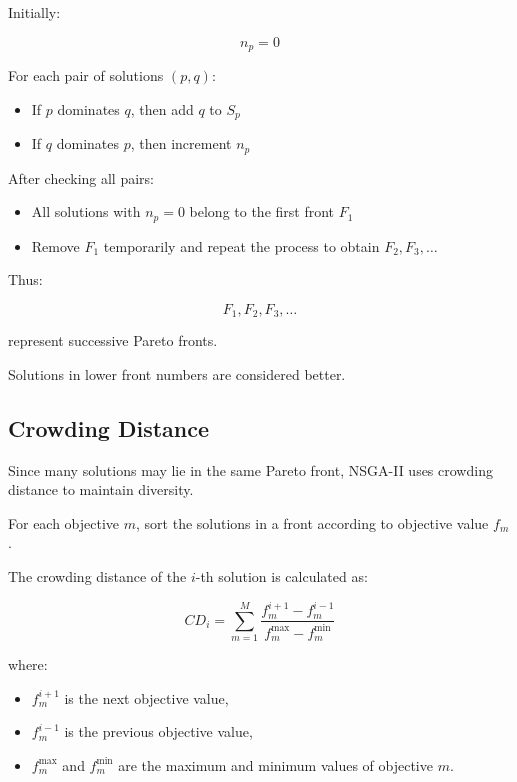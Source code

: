 \documentclass[11pt]{article}
\begin{document}
Initially:

\begin{equation}
n_p = 0
\end{equation}

For each pair of solutions $(p,q)$:

\begin{itemize}
    \item If $p$ dominates $q$, then add $q$ to $S_p$
    \item If $q$ dominates $p$, then increment $n_p$
\end{itemize}

After checking all pairs:

\begin{itemize}
    \item All solutions with $n_p = 0$ belong to the first front $F_1$
    \item Remove $F_1$ temporarily and repeat the process to obtain $F_2, F_3, \dots$
\end{itemize}

Thus:

\begin{equation}
F_1, F_2, F_3, \dots
\end{equation}

represent successive Pareto fronts.

Solutions in lower front numbers are considered better.

\subsection{Crowding Distance}

Since many solutions may lie in the same Pareto front, NSGA-II uses crowding distance to maintain diversity.

For each objective $m$, sort the solutions in a front according to objective value $f_m$.

The crowding distance of the $i$-th solution is calculated as:

\begin{equation}
CD_i = \sum_{m=1}^{M} \frac{f_m^{i+1} - f_m^{i-1}}{f_m^{\max} - f_m^{\min}}
\end{equation}

where:
\begin{itemize}
    \item $f_m^{i+1}$ is the next objective value,
    \item $f_m^{i-1}$ is the previous objective value,
    \item $f_m^{\max}$ and $f_m^{\min}$ are the maximum and minimum values of objective $m$.
\end{itemize}
\end{document}

